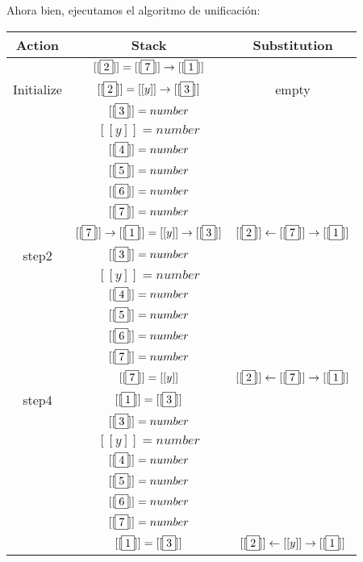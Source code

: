 \documentclass[letterpaper,11pt]{article}
\begin{document}
\begin{enumerate}
    Ahora bien, ejecutamos el algoritmo de unificación:
    \begin{center}
        \begin{longtable}{|c|c|c|}
             \hline
             Action & Stack & Substitution\\
             \hline
             &$[[\fbox{2}]]=[[\fbox{7}]]\rightarrow [[\fbox{1}]]$&\\
             Initialize&$[[\fbox{2}]]=[[y]]\rightarrow [[\fbox{3}]]$&empty\\
             &$[[\fbox{3}]]=number$&\\
             &$[[y]]=number$&\\
             &$[[\fbox{4}]]=number$&\\
             &$[[\fbox{5}]]=number$&\\
             &$[[\fbox{6}]]=number$&\\ 
             &$[[\fbox{7}]]=number$&\\
             \hline
             &$[[\fbox{7}]] \rightarrow [[\fbox{1}]]=[[y]]\rightarrow [[\fbox{3}]]$ & 
             $[[\fbox{2}]]\leftarrow[[\fbox{7}]]\rightarrow [[\fbox{1}]]$\\
             step2&$[[\fbox{3}]]=number$&\\
             &$[[y]]=number$&\\
             &$[[\fbox{4}]]=number$&\\
             &$[[\fbox{5}]]=number$& \\
             &$[[\fbox{6}]]=number$& \\
             &$[[\fbox{7}]]=number$& \\
             \hline
             &$[[\fbox{7}]]=[[y]]$&
             $[[\fbox{2}]]\leftarrow[[\fbox{7}]]\rightarrow [[\fbox{1}]]$\\
             step4&$[[\fbox{1}]]=[[\fbox{3}]]$&\\
             &$[[\fbox{3}]]=number$&\\
             &$[[y]]=number$&\\
             &$[[\fbox{4}]]=number$&\\
             &$[[\fbox{5}]]=number$&\\
             &$[[\fbox{6}]]=number$&\\
             &$[[\fbox{7}]]=number$&\\
             \hline
             &$[[\fbox{1}]]=[[\fbox{3}]]$&
             $[[\fbox{2}]]\leftarrow[[y]]\rightarrow [[\fbox{1}]]$\\

\end{longtable}
\end{center}
\end{enumerate}
\end{document}
